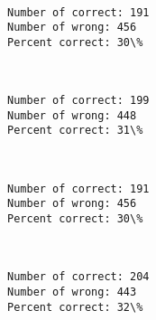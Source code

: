 \documentclass[11pt]{article}
\begin{document}
    \begin{center}
    \end{center}
    { \hspace*{\fill} \\}
    
    \begin{Verbatim}[commandchars=\\\{\}]
Number of correct: 191
Number of wrong: 456
Percent correct: 30\%

    \end{Verbatim}

    \begin{center}
    \end{center}
    { \hspace*{\fill} \\}
    
    \begin{Verbatim}[commandchars=\\\{\}]
Number of correct: 199
Number of wrong: 448
Percent correct: 31\%

    \end{Verbatim}

    \begin{center}
    \end{center}
    { \hspace*{\fill} \\}
    
    \begin{Verbatim}[commandchars=\\\{\}]
Number of correct: 191
Number of wrong: 456
Percent correct: 30\%

    \end{Verbatim}

    \begin{center}
    \end{center}
    { \hspace*{\fill} \\}
    
    \begin{Verbatim}[commandchars=\\\{\}]
Number of correct: 204
Number of wrong: 443
Percent correct: 32\%

    \end{Verbatim}
\end{document}
